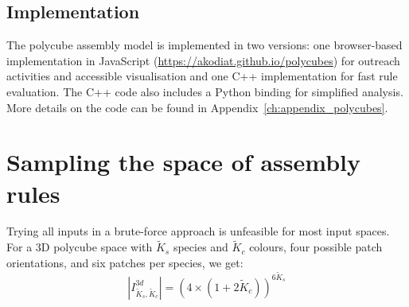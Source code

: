\subsection{Implementation}

The polycube assembly model is implemented in two versions: one browser-based implementation in JavaScript (\url{https://akodiat.github.io/polycubes}) for outreach activities and accessible visualisation and one C++ implementation for fast rule evaluation. The C++ code also includes a Python binding for simplified analysis. More details on the code can be found in Appendix~\ref{ch:appendix_polycubes}.




\section{Sampling the space of assembly rules}
Trying all inputs in a brute-force approach is unfeasible for most input spaces. For a 3D polycube space with \(\widetilde{K}_s\) species and \(\widetilde{K}_c\) colours, four possible patch orientations, and six patches per species, we get: 
\[
\left\lvert I_{\widetilde{K}_s, \widetilde{K}_c}^{3d}\right\rvert = (4 \times (1+2\widetilde{K}_c))^{6\widetilde{K}_s}
\]

